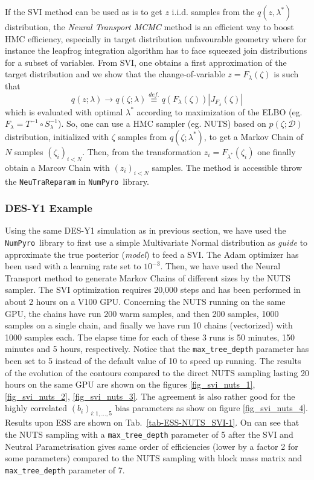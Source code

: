 \documentclass[final,5p,times,twocolumn,authoryear]{elsarticle}
\newcommand{\numpyro}{\texttt{NumPyro}}
\newcommand{\bydef}{\overset{def.}{\equiv}}
\begin{document}
If the SVI method can be used as is to get $z$ i.i.d. samples from the $q(z,\lambda^\ast)$ distribution, the \textit{Neural Transport MCMC} method \citep{2014arXiv1412.5492P,2019arXiv190303704H} is an efficient way to boost HMC efficiency, especially in target distribution unfavourable geometry where for instance the leapfrog integration algorithm has to face squeezed join distributions for a subset of variables. From SVI, one obtains a first approximation of the target distribution and we show that the change-of-variable $z=F_\lambda(\zeta)$ is such that
\begin{equation}
q(z;\lambda) \rightarrow q(\zeta;\lambda) \bydef q(F_\lambda(\zeta)) |J_{F_\lambda}(\zeta)|
\end{equation}
which is evaluated with optimal $\lambda^\ast$ according to maximization of the ELBO (eg. $F_\lambda=T^{-1}\circ S^{-1}_\lambda$). So, one can use a HMC sampler (eg. NUTS) based on $p(\zeta;\mathcal{D})$ distribution, initialized with $\zeta$ samples from $q(\zeta;\lambda^\ast)$, to get a Markov Chain of $N$ samples $(\zeta_i)_{i<N}$. Then, from the transformation  $z_i=F_{\lambda^\ast}(\zeta_i)$ one finally obtain a Marcov Chain with $(z_i)_{i<N}$ samples. The method is accessible throw the \verb|NeuTraReparam| in \numpyro\ library.
%
\subsubsection{DES-Y1 Example}
%
Using the same DES-Y1 simulation as in previous section, we have used the \numpyro\ library to first use a simple Multivariate Normal distribution as \textit{guide} to approximate the true posterior (\textit{model}) to feed a SVI. The Adam optimizer has been used with a learning rate set to $10^{-3}$.  Then, we have used the Neural Transport method to generate Markov Chains of different sizes by the NUTS sampler. The SVI optimization requires 20,000 steps and has been performed in about 2 hours on a V100 GPU. Concerning the NUTS running on the same GPU, the chains have run 200 warm samples, and then 200 samples, 1000 samples on a single chain, and finally we have run 10 chains (vectorized) with 1000 samples each. The elapse time for each of these 3 runs is 50 minutes, 150 minutes and 5 hours, respectively. Notice that the \texttt{max\_tree\_depth} parameter has been set to 5 instead of the default value of 10 to speed up running. The results of the evolution of the contours compared to the direct NUTS sampling lasting 20 hours on the same GPU are shown on the figures \ref{fig_svi_nuts_1}, \ref{fig_svi_nuts_2}, \ref{fig_svi_nuts_3}. The  agreement is also rather good for the highly correlated $(b_i)_{i:1,\dots,5}$ bias parameters as show on figure \ref{fig_svi_nuts_4}. Results upon ESS are shown on Tab.~\ref{tab-ESS-NUTS_SVI-1}. On can see that the NUTS sampling with a \texttt{max\_tree\_depth} parameter of 5 after the SVI and Neutral Parametrisation gives same order of efficiencies (lower by a factor 2 for some parameters) compared to the NUTS sampling with block mass matrix and \texttt{max\_tree\_depth} parameter of 7.
\end{document}
